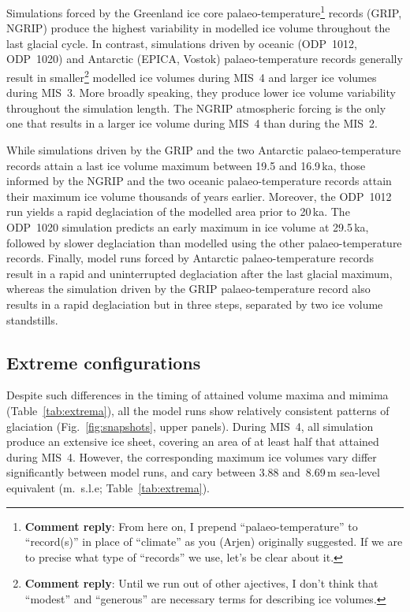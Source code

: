\documentclass[tc, manuscript]{copernicus}
\newcommand{\renote}[1]{\footnote{\textbf{Comment reply}: #1}}
\begin{document}
Simulations forced by the Greenland ice core palaeo-temperature\renote{
    From here on, I prepend ``palaeo-temperature'' to ``record(s)'' in place of
    ``climate'' as you (Arjen) originally suggested. If we are to precise what
    type of ``records'' we use, let's be clear about it.}
records (GRIP, NGRIP) produce the highest variability in modelled ice volume
throughout the last glacial cycle. In contrast, simulations driven by oceanic
(ODP~1012, ODP~1020) and Antarctic (EPICA, Vostok) palaeo-temperature records
generally result in smaller\renote{
    Until we run out of other ajectives, I don't think that ``modest'' and
    ``generous'' are necessary terms for describing ice volumes.}
modelled ice volumes during MIS~4 and larger ice volumes during MIS~3.
More broadly speaking, they produce lower ice volume variability
throughout the simulation length. The NGRIP atmospheric forcing is the only one
that results in a larger ice volume during MIS~4 than during the MIS~2.

While simulations driven by the GRIP and the two Antarctic palaeo-temperature
records attain a last ice volume maximum between 19.5 and 16.9\,ka, those
informed by the NGRIP and the two oceanic palaeo-temperature records attain their
maximum ice volume thousands of years earlier. Moreover, the ODP~1012 run
yields a rapid deglaciation of the modelled area prior to 20\,ka. The ODP~1020
simulation predicts an early maximum in ice volume at 29.5\,ka, followed by
slower deglaciation than modelled using the other palaeo-temperature records.
Finally, model runs forced by Antarctic palaeo-temperature records result in a
rapid and uninterrupted deglaciation after the last glacial maximum, whereas the
simulation driven by the GRIP palaeo-temperature record also results in a rapid
deglaciation but in three steps, separated by two ice volume standstills.

\subsection{Extreme configurations}

Despite such differences in the timing of attained volume maxima and mimima
(Table~\ref{tab:extrema}), all the model runs show relatively consistent
patterns of glaciation (Fig.~\ref{fig:snapshots}, upper panels). During MIS~4,
all simulation produce an extensive ice sheet, covering an area of at least
half that attained during MIS~4. However, the corresponding maximum ice volumes
vary differ significantly between model runs, and cary between 3.88 and~8.69\,m
sea-level equivalent (m.~s.l.e; Table~\ref{tab:extrema}).
\end{document}
